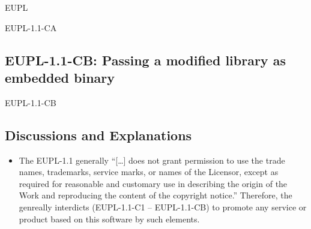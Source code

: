 \begin{license}{EUPL}
\begin{lsuc}{EUPL-1.1-CA}
\end{lsuc}

\subsection{EUPL-1.1-CB: Passing a modified library as embedded binary}
\begin{lsuc}{EUPL-1.1-CB}



  \begin{lsucrequires}
    \lsucmandatory{\keepLicensingElements \addWhenCompiling}
    \lsucmandatory{\giveLicense}\passingFilesCorrectly
    \lsucmandatory{\addModificationTextFile}
    \lsucmandatory{\makeAllSourcesAvailable}
    \lsucmandatory{\mentionRepositoryInDocumentation}
    \lsucmandatory{\arrangeBinaryModifications}
    \lsucmandatory{\applyCopyleftToBinaries}
    \lsucoptional{\markAllEmbeddedModifications}
    \lsucoptional{\addToYourCopyrightNotice}
  \end{lsucrequires}

  \begin{lsucprohibits}
    \lsucitem{\noTrademarks}
  \end{lsucprohibits}

\end{lsuc}

\subsection{Discussions and Explanations}
\label{EUPLDiscussion}
\begin{itemize}
  
\item The EUPL-1.1 generally \enquote{[\ldots] does not grant permission to use
  the trade names, trademarks, service marks, or names of the Licensor, except
  as required for reasonable and customary use in describing the origin of the
  Work and reproducing the content of the copyright notice.} 
  Therefore, the \oslic{} genreally interdicts (EUPL-1.1-C1 -- EUPL-1.1-CB) to promote any
  service or product based on this software by such elements. 


\end{itemize}
\end{license}
